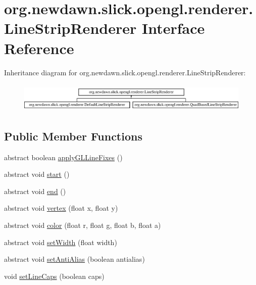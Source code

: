 \hypertarget{interfaceorg_1_1newdawn_1_1slick_1_1opengl_1_1renderer_1_1_line_strip_renderer}{}\section{org.\+newdawn.\+slick.\+opengl.\+renderer.\+Line\+Strip\+Renderer Interface Reference}
\label{interfaceorg_1_1newdawn_1_1slick_1_1opengl_1_1renderer_1_1_line_strip_renderer}
Inheritance diagram for org.\+newdawn.\+slick.\+opengl.\+renderer.\+Line\+Strip\+Renderer\+:\begin{figure}[H]
\begin{center}
\leavevmode
\includegraphics[height=1.421320cm]{interfaceorg_1_1newdawn_1_1slick_1_1opengl_1_1renderer_1_1_line_strip_renderer}
\end{center}
\end{figure}
\subsection*{Public Member Functions}
\begin{DoxyCompactItemize}
\item 
abstract boolean \mbox{\hyperlink{interfaceorg_1_1newdawn_1_1slick_1_1opengl_1_1renderer_1_1_line_strip_renderer_a6cacd7974c575c5e49034a89a51492c2}{apply\+G\+L\+Line\+Fixes}} ()
\item 
abstract void \mbox{\hyperlink{interfaceorg_1_1newdawn_1_1slick_1_1opengl_1_1renderer_1_1_line_strip_renderer_ac677ca9ed9c30f39a3eeb72b0532229a}{start}} ()
\item 
abstract void \mbox{\hyperlink{interfaceorg_1_1newdawn_1_1slick_1_1opengl_1_1renderer_1_1_line_strip_renderer_a59c0befa698a8a069ce66fa134c1f284}{end}} ()
\item 
abstract void \mbox{\hyperlink{interfaceorg_1_1newdawn_1_1slick_1_1opengl_1_1renderer_1_1_line_strip_renderer_a9051033674d28d26c5750155df2c5113}{vertex}} (float x, float y)
\item 
abstract void \mbox{\hyperlink{interfaceorg_1_1newdawn_1_1slick_1_1opengl_1_1renderer_1_1_line_strip_renderer_ac54eda776408b41d1e5ccaa988267162}{color}} (float r, float g, float b, float a)
\item 
abstract void \mbox{\hyperlink{interfaceorg_1_1newdawn_1_1slick_1_1opengl_1_1renderer_1_1_line_strip_renderer_afc8159c0766c0d177b402cf311d9a7b8}{set\+Width}} (float width)
\item 
abstract void \mbox{\hyperlink{interfaceorg_1_1newdawn_1_1slick_1_1opengl_1_1renderer_1_1_line_strip_renderer_a849fde4a1b5b6981e77978bb3afa2b3b}{set\+Anti\+Alias}} (boolean antialias)
\item 
void \mbox{\hyperlink{interfaceorg_1_1newdawn_1_1slick_1_1opengl_1_1renderer_1_1_line_strip_renderer_ac2c299158c60d76e8745759dd2dc8633}{set\+Line\+Caps}} (boolean caps)
\end{DoxyCompactItemize}


